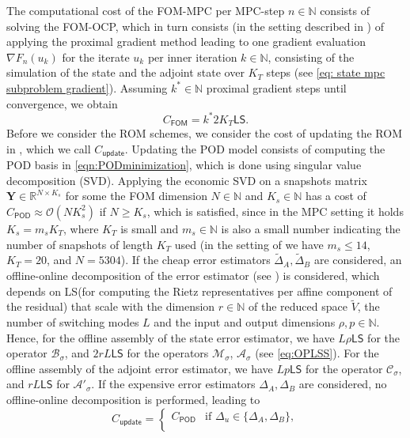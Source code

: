 \documentclass[reqno]{amsart}
\newcommand{\R}{\mathbb R}
\newcommand{\N}{\mathbb N}
\newcommand{\inpVarDim}{\rho}
\newcommand{\outVarDim}{p}
\newcommand{\switch}{\sigma}
\newcommand{\nrModes}{L}
\newcommand{\reduce}[1]{\tilde{#1}}
\newcommand{\Vred}{\reduce{V}}
\newcommand{\calA}{\mathcal{A}}
\newcommand{\calB}{\mathcal{B}}
\newcommand{\calC}{\mathcal{C}}
\newcommand{\calM}{\mathcal{M}}
\newcommand{\calO}{\mathcal{O}}
\newcommand{\abbr}[1]{\textsf{#1}\xspace}
\newcommand{\FOM}{\abbr{FOM}}
\newcommand{\ROM}{\abbr{ROM}}
\newcommand{\MPC}{\abbr{MPC}}
\newcommand{\OCP}{\abbr{OCP}}
\newcommand{\POD}{\abbr{POD}} %
\newcommand{\LS}{\abbr{LS}}
\newcommand{\SVD}{\abbr{SVD}}
\newcommand{\cost}{C}
\newcommand{\costFOM}{\cost_{\FOM}}
\newcommand{\costUpdate}{\cost_{\textsf{update}}}
\newcommand{\costPOD}{\cost_{\textsf{POD}}}
\begin{document}
{The computational cost of the \FOM-\MPC per \MPC-step $n\in \N$ consists of solving the \FOM-\OCP, which in turn consists (in the setting described in ) of applying the proximal gradient method leading to one gradient evaluation $\nabla F_n(u_k)$ for the iterate $u_k$ per inner iteration $k\in \N$, consisting of the simulation of the state and the adjoint state over $K_T$ steps (see \eqref{eq: state mpc subproblem gradient}). Assuming $k^*\in \N$ proximal gradient steps until convergence, we obtain
%
\begin{equation}
    \costFOM= k^*2K_T\LS.
\end{equation}
%
Before we consider the \ROM schemes, we consider the cost of updating the \ROM in , which we call $\costUpdate$. Updating the \POD model consists of computing the \POD basis in \eqref{eqn:PODminimization}, which is done using singular value decomposition (\SVD). Applying the economic SVD on a snapshots matrix $\mathbf Y \in \R^{N\times K_s}$ for some the \FOM dimension $N\in\N$ and $K_s\in \N$ has a cost of $\costPOD\approx\calO(NK_s^2)$ if $N\geq K_s$, which is satisfied, since in the \MPC setting it holds $K_s=m_s K_T$, where $K_T$ is small and $m_s\in \N$ is also a small number indicating the number of snapshots of length $K_T$ used (in the setting of  we have $m_s\leq14$, $K_T=20$, and $N=5304$). If the cheap error estimators $\tilde \Delta_A,\tilde \Delta_B$ are considered, an offline-online decomposition of the error estimator (see \cite{Hesthaven2016}) is considered, which depends on \LS (for computing the Rietz representatives per affine component of the residual) that scale with the dimension $r\in \N$ of the reduced space $\Vred$, the number of switching modes $\nrModes$ and the input and output dimensions $\inpVarDim,\outVarDim\in \N$. Hence, for the offline assembly of the state error estimator, we have $\nrModes\inpVarDim \LS$ for the operator $\calB_\switch$, and $2r\nrModes \LS$ for the operators $\calM_\switch$,  $\calA_\switch$ (see \eqref{eq:OPLSS}). For the offline assembly of the adjoint error estimator, we have $\nrModes\outVarDim \LS$ for the operator $\calC_\switch$, and $r\nrModes \LS$ for $\calA'_\switch$. If the expensive error estimators $\Delta_A,\Delta_B$ are considered, no offline-online decomposition is performed, leading to
%
\begin{equation}\label{eq:app:costupdate}
    \costUpdate =
    \begin{cases}
        \costPOD &\text{if }\Delta_u\in \{\Delta_A,\Delta_B\},\\

\end{cases}
\end{equation}}
\end{document}
